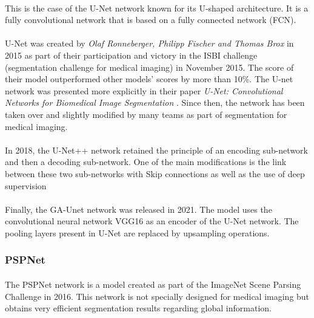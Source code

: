 \documentclass[english]{article}
\begin{document}
\paragraph{}
This is the case of the U-Net network known for its U-shaped architecture. It is a fully convolutional network that is based on a fully connected network (FCN).

\paragraph{}
U-Net was created by \emph{Olaf Ronneberger, Philipp Fischer and Thomas Brox} in 2015 as part of their participation and victory in the ISBI challenge (segmentation challenge for medical imaging) in November 2015. The score of their model outperformed other models' scores by more than 10\%. The U-net network was presented more explicitly in their paper \emph{U-Net: Convolutional Networks for Biomedical Image Segmentation} \cite{UNet}. Since then, the network has been taken over and slightly modified by many teams as part of segmentation for medical imaging.

\paragraph{}
In 2018, the U-Net++ \cite{U-Net++} network retained the principle of an encoding sub-network and then a decoding sub-network. One of the main modifications is the link between these two sub-networks with Skip connections as well as the use of deep supervision

\paragraph{}
Finally, the GA-Unet \cite{GA-UNet} network was released in 2021. The model uses the convolutional neural network VGG16 as an encoder of the U-Net network. The pooling layers present in U-Net are replaced by upsampling operations.

\subsubsection{PSPNet}
\paragraph{}
The PSPNet network \cite{PSPNet} is a model created as part of the ImageNet Scene Parsing Challenge in 2016. This network is not specially designed for medical imaging but obtains very efficient segmentation results regarding global information.
\end{document}
